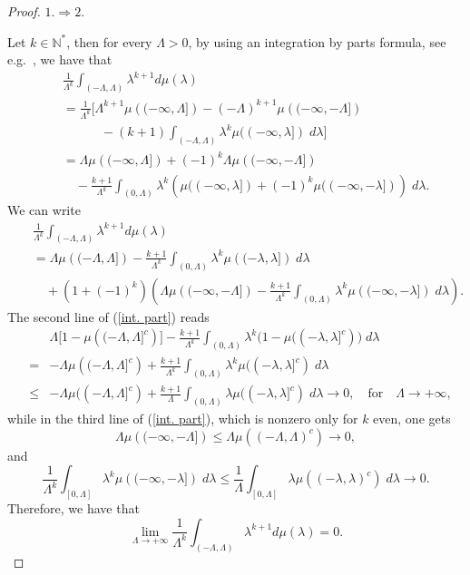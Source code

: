 \documentclass[aip,jmp
]{revtex4}
\newcommand{\NM}{\mathbb{N}}
\theoremstyle{definition}
\begin{document}
\begin{proof}
\quad\newline

$1. \Rightarrow 2.$

Let $k \in \NM^*$, then for every $\Lambda >0$, by using an integration by parts formula, see e.g.\ \cite{Riesz}, we have that
\begin{eqnarray*}
& &\frac{1}{\Lambda^{k}} \int_{(-\Lambda,\Lambda)} \lambda^{k+1} d\mu(\lambda) \nonumber\\
& & =  \frac{1}{\Lambda^{k}} \Big[ \Lambda^{k+1} \mu\left((-\infty,\Lambda]\right)-(-\Lambda)^{k+1}\mu\left((-\infty,-\Lambda]\right)
\nonumber\\
& &\quad\qquad -(k+1) \int_{(-\Lambda,\Lambda)}\lambda^{k} \mu ((-\infty, \lambda]) \; d \lambda \Big] \nonumber\\
& & = \Lambda \mu\left((-\infty,\Lambda]\right)+(-1)^{k}\Lambda\mu\left((-\infty,-\Lambda]\right) \nonumber \\
& & \quad -\frac{k+1}{\Lambda^{k}} \int_{(0,\Lambda)}\lambda^{k} \left(\mu ((-\infty, \lambda])+(-1)^{k}\mu((-\infty, -\lambda])\right) \; d \lambda.
\end{eqnarray*}
We can write
\begin{eqnarray}
& &\frac{1}{\Lambda^{k}} \int_{(-\Lambda,\Lambda)} \lambda^{k+1} d\mu(\lambda) \nonumber\\
& & = \Lambda \mu \left( (-\Lambda,\Lambda] \right)-\frac{k+1}{\Lambda^k}\int_{(0,\Lambda)}\lambda^k \mu\left((-\lambda,\lambda]\right) \; d \lambda \nonumber\\
&  &\quad + \left(1+(-1)^k\right)\left(\Lambda \mu \left( (-\infty,-\Lambda] \right)-\frac{k+1}{\Lambda^k}\int_{(0,\Lambda)}\lambda^k \mu\left((-\infty,-\lambda] \right) \; d \lambda \right).
\label{int. part}
\end{eqnarray}
The second line of (\ref {int. part}) reads
\begin{eqnarray*}
&  & \Lambda \Big[1-\mu \left( (-\Lambda,\Lambda]^c \right) \Big] -\frac{k+1}{\Lambda^k}\int_{(0,\Lambda)}\lambda^k \Big( 1-\mu ((-\lambda,\lambda]^c)\Big) \; d \lambda \nonumber\\
& = & 
- \Lambda \mu \left( (-\Lambda,\Lambda]^c \right)
+ \frac{k+1}{\Lambda^k} \int_{(0,\Lambda)}\lambda^k \mu ((-\lambda,\lambda]^c) \; d \lambda \nonumber\\
& \leq & - \Lambda \mu ( (-\Lambda,\Lambda]^c) + \frac{k+1}{\Lambda} \int_{(0,\Lambda)}\lambda \mu ((-\lambda,\lambda]^c) \; d \lambda  \to 0, \quad \textrm{for} \quad \Lambda \to +\infty,
\end{eqnarray*}
while in the third line of (\ref {int. part}), which is nonzero only for $k$ even, one gets
$$
\Lambda \mu \left( (-\infty,-\Lambda] \right) \leq \Lambda \mu \left( (-\Lambda,\Lambda)^c \right) \to 0,
$$
and
$$
\frac{1}{\Lambda^k}\int_{[0,\Lambda]}\lambda^k \mu\left((-\infty,-\lambda]\right) \; d \lambda
\leq \frac{1}{\Lambda}\int_{[0,\Lambda]}\lambda \mu\left((-\lambda,\lambda)^c\right) \; d \lambda
\to 0.
$$
Therefore, we have that
$$
\lim_{\Lambda \to +\infty} \frac{1}{\Lambda^{k}} \int_{(-\Lambda,\Lambda)} \lambda^{k+1} d\mu(\lambda)=0.
$$


\end{proof}
\end{document}
